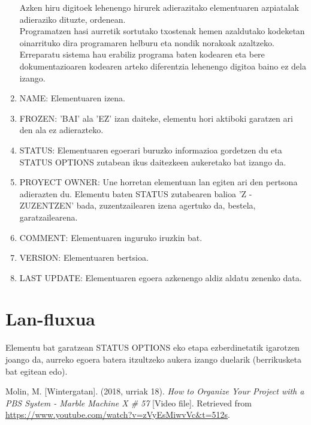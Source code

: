 \documentclass[10pt,a4paper]{article}
\let\nf\normalfont %
\newcommand{\cf}{\normalfont\sffamily}
\begin{document}
\begin{enumerate}
Azken hiru digitoek lehenengo hirurek adierazitako elementuaren azpiatalak adieraziko dituzte, ordenean.
\\

Programatzen hasi aurretik sortutako txostenak hemen azaldutako kodeketan oinarrituko dira programaren helburu eta nondik norakoak azaltzeko.
\\

Erreparatu sistema hau erabiliz programa baten kodearen eta bere dokumentazioaren kodearen arteko diferentzia lehenengo digitoa baino ez dela izango.
\\ 

\item \cf NAME: \nf Elementuaren izena.
\\

\item \cf FROZEN: \nf 'BAI' ala 'EZ' izan daiteke, elementu hori aktiboki garatzen ari den ala ez adierazteko.
\\

\item \cf STATUS: \nf Elementuaren egoerari buruzko informazioa gordetzen du eta \cf STATUS OPTIONS \nf zutabean ikus daitezkeen aukeretako bat izango da.
\\

\item \cf PROYECT OWNER: \nf Une horretan elementuan lan egiten ari den pertsona adierazten du. Elementu baten \cf STATUS \nf zutabearen balioa \cf 'Z - ZUZENTZEN' \nf bada, zuzentzailearen izena agertuko da, bestela, garatzailearena.
\\

\item \cf COMMENT: \nf Elementuaren inguruko iruzkin bat.
\\

\item \cf VERSION: \nf Elementuaren bertsioa.
\\

\item \cf LAST UPDATE: \nf Elementuaren egoera azkenengo aldiz aldatu zenenko data.
\\
\end{enumerate} 

\section{Lan-fluxua}

Elementu bat garatzean \cf STATUS OPTIONS \nf eko etapa ezberdinetatik igarotzen joango da, aurreko egoera batera itzultzeko aukera izango duelarik (berrikusketa bat egitean edo).
 
\begin{thebibliography}{1}
 Molin, M. [Wintergatan]. (2018, urriak 18). \textit{How to Organize Your Project with a PBS System - Marble Machine X \# 57} [Video file]. Retrieved from \url{https://www.youtube.com/watch?v=zVyEsMiwvVc&t=512s}.
\end{thebibliography}
\end{document}
